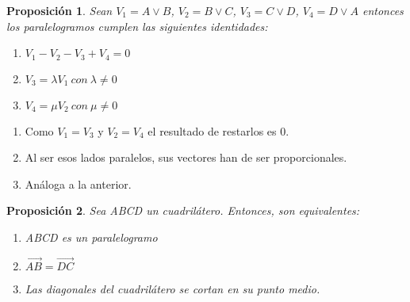 \documentclass[11pt, a4paper]{article}
\makeatletter
\newif\IfInSansMode
\let\oldsf\sffamily
\renewcommand*{\sffamily}{\oldsf\mathversion{sans}\InSansModetrue}
\let\oldnorm\normalfont
\renewcommand*{\normalfont}{\oldnorm\InSansModefalse\mathversion{normal}}
\renewenvironment{proof}[1][\proofname] {\vspace{-15pt}\par\pushQED{\qed}\normalfont\topsep6\p@\@plus6\p@\relax\trivlist\item[\hskip\labelsep\it#1\@addpunct{.}]\ignorespaces}{\popQED\endtrivlist\@endpefalse}
\renewcommand{\vec}{\overrightarrow}
\renewenvironment{proof}[1][\proofname] {\par\pushQED{\qed}\normalfont\topsep6\p@\@plus6\p@\relax\trivlist\item[\hskip\labelsep\itshape\sffamily#1\@addpunct{.}]\ignorespaces}{\popQED\endtrivlist\@endpefalse}
\theoremstyle{theorem-style}
\newtheorem{nprop}{Proposición}[section]
\theoremstyle{definition-style}
\theoremstyle{remark-style}
\theoremstyle{example-style}
\newenvironment{nlist}
{\begin{enumerate}
    \renewcommand\labelenumi{(\emph{\roman{enumi})}}}
  {\end{enumerate}}
\makeatother
\begin{document}
\hfill

\begin{nprop}
	Sean $V_{1} = A \vee B$, $V_{2} = B \vee C$, $V_{3} = C\vee D$, $V_{4} = D \vee A$ entonces los paralelogramos cumplen las siguientes identidades:
  \begin{nlist}
  \item $V_{1} - V_{2} - V_{3} + V_{4} = 0$
  \item $V_{3} = \lambda V_{1}\ con\ \lambda \neq 0$
  \item $V_{4} = \mu V_{2}\ con\ \mu \neq 0$
  \end{nlist}
\end{nprop}

\begin{proof} \hfill
	\begin{nlist} 
		\item Como $V_1 = V_3$ y $V_2 = V_4$ el resultado de restarlos es $0$.
		\item Al ser esos lados paralelos, sus vectores han de ser proporcionales.
		\item Análoga a la anterior.
	\end{nlist}
\end{proof}


\begin{nprop}
  Sea ABCD un cuadrilátero. Entonces, son equivalentes:
  \begin{nlist}
  \item ABCD es un paralelogramo
  \item $\vec{AB} = \vec{DC}$
  \item Las diagonales del cuadrilátero se cortan en su punto medio.
  \end{nlist}
\end{nprop}
\end{document}
